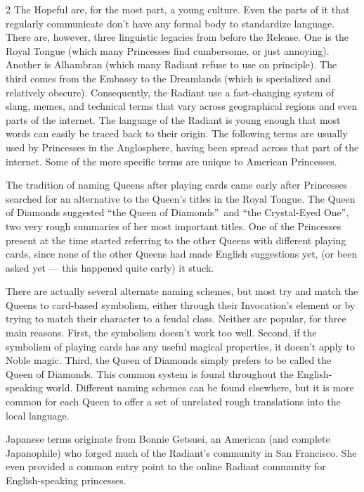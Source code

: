 \begin{multicols}{2}
The Hopeful are, for the most part, a young culture. Even the parts of it that regularly communicate don't have any formal body to standardize language. There are, however, three linguistic legacies from before the Release. One is the Royal Tongue (which many Princesses find cumbersome, or just annoying). Another is Alhambran (which many Radiant refuse to use on principle). The third comes from the Embassy to the Dreamlands (which is specialized and relatively obscure). Consequently, the Radiant use a fast-changing system of slang, memes, and technical terms that vary across geographical regions and even parts of the internet. The language of the Radiant is young enough that most words can easily be traced back to their origin. The following terms are usually used by Princesses in the Anglosphere, having been spread across that part of the internet. Some of the more specific terms are unique to American Princesses. 

The tradition of naming Queens after playing cards came early after Princesses searched for an alternative to the Queen's titles in the Royal Tongue. The Queen of Diamonds suggested \textquotedblleft the Queen of Diamonds\textquotedblright\, and \textquotedblleft the Crystal-Eyed One\textquotedblright, two very rough summaries of her most important titles. One of the Princesses present at the time started referring to the other Queens with different playing cards, since none of the other Queens had made English suggestions yet, (or been asked yet — this happened quite early) it stuck. 

There are actually several alternate naming schemes, but most try and match the Queens to card-based symbolism, either through their Invocation's element or by trying to match their character to a feudal class. Neither are popular, for three main reasons. First, the symbolism doesn't work too well. Second, if the symbolism of playing cards has any useful magical properties, it doesn't apply to Noble magic. Third, the Queen of Diamonds simply prefers to be called the Queen of Diamonds. This common system is found throughout the English-speaking world. Different naming schemes can be found elsewhere, but it is more common for each Queen to offer a set of unrelated rough translations into the local language. 

Japanese terms originate from Bonnie Getsuei, an American (and complete Japanophile) who forged much of the Radiant's community in San Francisco. She even provided a common entry point to the online Radiant community for English-speaking princesses. 


\end{multicols}
